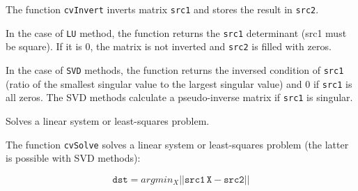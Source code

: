 \begin{description}
\end{description}

The function \texttt{cvInvert} inverts matrix \texttt{src1} and stores the result in \texttt{src2}.

In the case of \texttt{LU} method, the function returns the \texttt{src1} determinant (src1 must be square). If it is 0, the matrix is not inverted and \texttt{src2} is filled with zeros.

In the case of \texttt{SVD} methods, the function returns the inversed condition of \texttt{src1} (ratio of the smallest singular value to the largest singular value) and 0 if \texttt{src1} is all zeros. The SVD methods calculate a pseudo-inverse matrix if \texttt{src1} is singular.


\label{Solve}

Solves a linear system or least-squares problem.


\begin{description}
\end{description}

The function \texttt{cvSolve} solves a linear system or least-squares problem (the latter is possible with SVD methods):

\[
\texttt{dst} = argmin_X||\texttt{src1} \, \texttt{X} - \texttt{src2}||
\]

